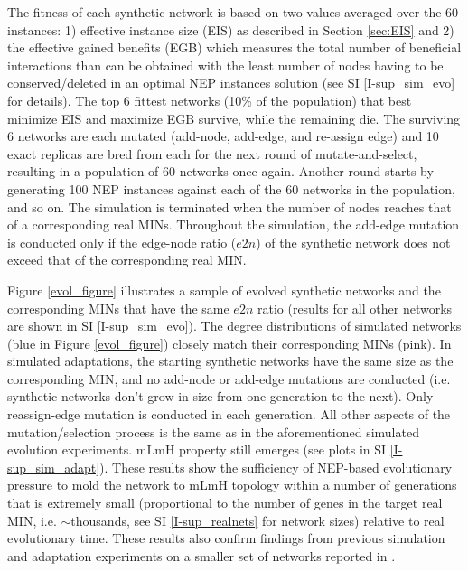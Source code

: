     The fitness of each synthetic network is based on two values averaged over the 60 instances: 1) effective instance size (EIS) as described in Section \ref{sec:EIS}  and 2) the effective gained benefits (EGB) which measures the total number of beneficial interactions than can be obtained with the least number of nodes having to be conserved/deleted in an optimal NEP instances solution (see SI \ref{I-sup_sim_evo} for details). The top 6  fittest  networks (10\% of the population) that best minimize EIS and maximize EGB survive, while the remaining die. The surviving 6 networks are each mutated (add-node, add-edge, and re-assign edge) and 10 exact replicas are bred from each for the next round of mutate-and-select, resulting in a population of 60 networks once again. Another round starts by generating 100 NEP instances against each of the 60 networks in the population, and so on. The simulation is terminated when the number of nodes reaches that of a corresponding real MINs. Throughout the simulation, the add-edge mutation is conducted only if the edge-node ratio ($e2n$) of the synthetic network does not exceed that of the corresponding real MIN.

    Figure \ref{evol_figure} illustrates a sample of evolved synthetic networks and the corresponding MINs that have the same $e2n$ ratio (results for all other networks are shown in SI \ref{I-sup_sim_evo}). The degree distributions of simulated networks (blue in Figure \ref{evol_figure}) closely match their corresponding MINs (pink). In simulated adaptations, the starting synthetic networks have the same size as the corresponding MIN, and no add-node or add-edge mutations are conducted (i.e. synthetic networks don't grow in size from one generation to the next). Only reassign-edge mutation is conducted in each generation. All other aspects of the mutation/selection process is the same as in the aforementioned simulated evolution experiments. mLmH property still emerges (see plots in SI \ref{I-sup_sim_adapt}). These results show the sufficiency of NEP-based evolutionary pressure to mold the network to mLmH topology within a number of generations that is extremely small (proportional to the number of genes in the target real MIN, i.e. ${\sim}$thousands, see SI \ref{I-sup_realnets} for network sizes) relative to real evolutionary time. These results also confirm findings from previous simulation and adaptation experiments on a smaller set of networks reported in \cite{atiia_computational_2017-1}.
